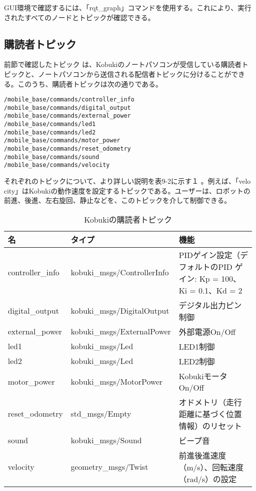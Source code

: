 GUI環境で確認するには、「rqt\_graph」コマンドを使用する。これにより、実行されたすべてのノードとトピックが確認できる。

\subsection{購読者トピック}

前節で確認したトピック  は、Kobukiのノートパソコンが受信している購読者トピックと、ノートパソコンから送信される配信者トピックに分けることができる。このうち、購読者トピックは次の通りである。

\begin{lstlisting}[language=ROS]
/mobile_base/commands/controller_info
/mobile_base/commands/digital_output
/mobile_base/commands/external_power
/mobile_base/commands/led1
/mobile_base/commands/led2
/mobile_base/commands/motor_power
/mobile_base/commands/reset_odometry
/mobile_base/commands/sound
/mobile_base/commands/velocity
\end{lstlisting}

それぞれのトピックについて、より詳しい説明を表9-2に示す１ 。例えば、「velo\\city」はKobukiの動作速度を設定するトピックである。ユーザーは、ロボットの前進、後進、左右旋回、静止などを、このトピックを介して制御できる。

\begin{table}[htp]
\centering
\small
\begin{tabular}{p{2cm} p{5cm} p{5cm}}
\toprule
\textbf{名} & \textbf{タイプ} & \textbf{機能}\\
\midrule
controller\_info & kobuki\_msgs/ControllerInfo  &  PIDゲイン設定（デフォルトのPID ゲイン: Kp = 100、Ki = 0.1、Kd = 2\\
digital\_output  & kobuki\_msgs/DigitalOutput & デジタル出力ピン制御 \\
external\_power  & kobuki\_msgs/ExternalPower & 外部電源On/Off \\
led1 & kobuki\_msgs/Led & LED1制御 \\
led2  & kobuki\_msgs/Led & LED2制御 \\
motor\_power & kobuki\_msgs/MotorPower  & KobukiモータOn/Off \\
reset\_odometry  & std\_msgs/Empty  & オドメトリ（走行距離に基づく位置情報）のリセット \\
sound & kobuki\_msgs/Sound & ビープ音 \\
velocity  & geometry\_msgs/Twist & 前進後進速度（m/s）、回転速度（rad/s）の設定 \\
\bottomrule
\end{tabular}
\caption{Kobukiの購読者トピック}
\end{table}

